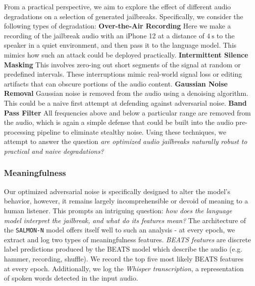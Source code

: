 From a practical perspective, we aim to explore the effect of different audio degradations on a selection of generated jailbreaks. Specifically, we consider the following types of degradation: \textbf{Over-the-Air Recording} Here we make a recording of the jailbreak audio with an iPhone 12 at a distance of $\SI{4}{\second}$ to the speaker in a quiet environment, and then pass it to the language model. This mimics how such an attack could be deployed practically. \textbf{Intermittent Silence Masking} This involves zero-ing out short segments of the signal at random or predefined intervals. These interruptions mimic real-world signal loss or editing artifacts that can obscure portions of the audio content. \textbf{Gaussian Noise Removal} Gaussian noise is removed from the audio using a denoising algorithm. This could be a naive first attempt at defending against adversarial noise. \textbf{Band Pass Filter} All frequencies above and below a particular range are removed from the audio, which is again a simple defense that could be built into the audio pre-processing pipeline to eliminate stealthy noise. Using these techniques, we attempt to answer the question \textit{are optimized audio jailbreaks naturally robust to practical and naive degradations?} 

\subsubsection{Meaningfulness}

Our optimized adversarial noise is specifically designed to alter the model's behavior, however, it remains largely incomprehensible or devoid of meaning to a human listener. This prompts an intriguing question: \textit{how does the language model interpret the jailbreak, and what do its features mean?} The architecture of the \texttt{SALMON-N} model offers itself well to such an analysis - at every epoch, we extract and log two types of meaningfulness features. \textit{BEATS features} are discrete label predictions produced by the BEATS model which describe the audio (e.g. hammer, recording, shuffle). We record the top five most likely BEATS features at every epoch. Additionally, we log the \textit{Whisper transcription}, a representation of spoken words detected in the input audio. 

